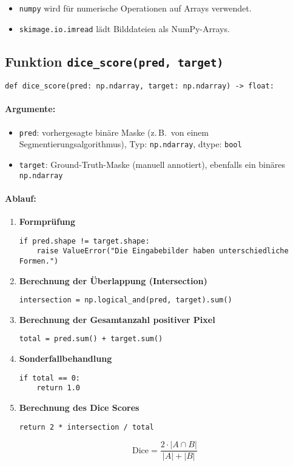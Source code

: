 \documentclass[a4paper,12pt]{article}
\begin{document}
\begin{itemize}
  \item \texttt{numpy} wird für numerische Operationen auf Arrays verwendet.
  \item \texttt{skimage.io.imread} lädt Bilddateien als NumPy-Arrays.
\end{itemize}

\subsection*{Funktion \texttt{dice\_score(pred, target)}}
\begin{verbatim}
def dice_score(pred: np.ndarray, target: np.ndarray) -> float:
\end{verbatim}

\paragraph{Argumente:}
\begin{itemize}
  \item \texttt{pred}: vorhergesagte binäre Maske (z.\,B.\ von einem Segmentierungsalgorithmus), Typ: \texttt{np.ndarray}, dtype: \texttt{bool}
  \item \texttt{target}: Ground-Truth-Maske (manuell annotiert), ebenfalls ein binäres \texttt{np.ndarray}
\end{itemize}

\paragraph{Ablauf:}
\begin{enumerate}
  \item \textbf{Formprüfung}
\begin{verbatim}
if pred.shape != target.shape:
    raise ValueError("Die Eingabebilder haben unterschiedliche Formen.")
\end{verbatim}

  \item \textbf{Berechnung der Überlappung (Intersection)}
\begin{verbatim}
intersection = np.logical_and(pred, target).sum()
\end{verbatim}

  \item \textbf{Berechnung der Gesamtanzahl positiver Pixel}
\begin{verbatim}
total = pred.sum() + target.sum()
\end{verbatim}

  \item \textbf{Sonderfallbehandlung}
\begin{verbatim}
if total == 0:
    return 1.0
\end{verbatim}

  \item \textbf{Berechnung des Dice Scores}
\begin{verbatim}
return 2 * intersection / total
\end{verbatim}
\[
\text{Dice} = \frac{2 \cdot |A \cap B|}{|A| + |B|}
\]
\end{enumerate}
\end{document}
